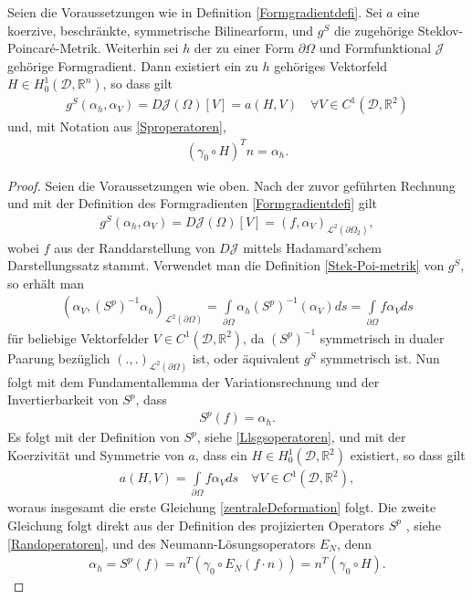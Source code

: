 \begin{theorem}
Seien die Voraussetzungen wie in Definition \ref{Formgradientdefi}. Sei $a$ eine koerzive, beschränkte, symmetrische Bilinearform, und $g^S$ die zugehörige Steklov-Poincaré-Metrik. Weiterhin sei $h$ der zu einer Form $\partial\Omega$ und Formfunktional $\mathcal{J}$ gehörige Formgradient. Dann existiert ein zu $h$ gehöriges Vektorfeld $H \in H^1_0(\mathcal{D}, \mathbb{R}^n)$, so dass gilt
\begin{equation}
\label{zentraleDeformation}
\begin{aligned}
	g^S(\alpha_h, \alpha_V) = D\mathcal{J}(\Omega)[V] = a(H,V) \quad \forall  V \in C^1(\mathcal{D},\mathbb{R}^2)
\end{aligned}
\end{equation}
und, mit Notation aus \ref{Sproperatoren},
\begin{align*}
	(\gamma_0\circ H)^T n = \alpha_h.
\end{align*}
\end{theorem}

\begin{proof}
Seien die Voraussetzungen wie oben. Nach der zuvor geführten Rechnung und mit der Definition des Formgradienten \ref{Formgradientdefi} gilt
\begin{align*}
	g^S(\alpha_h, \alpha_V) = D\mathcal{J}(\Omega)[V] = (f,\alpha_V)_{\mathcal{L}^2(\partial\Omega_2)},
\end{align*}
wobei $f$ aus der Randdarstellung von $D\mathcal{J}$ mittels Hadamard'schem Darstellungssatz stammt. Verwendet man die Definition \ref{Stek-Poi-metrik} von $g^S$, so erhält man
\begin{align*}
	(\alpha_V,(S^p)^{-1} \alpha_h)_{\mathcal{L}^2(\partial\Omega)} = \underset{\partial\Omega}{\int} \alpha_h (S^p)^{-1}(\alpha_V)ds = 				\underset{\partial\Omega}{\int} f \alpha_V ds
\end{align*}
für beliebige Vektorfelder $V\in C^1(\mathcal{D}, \mathbb{R}^2)$, da $(S^p)^{-1}$  symmetrisch in dualer Paarung bezüglich $(.,.)_{\mathcal{L}^2(\partial\Omega)}$ ist, oder äquivalent $g^S$ symmetrisch ist.  Nun folgt mit dem Fundamentallemma der Variationsrechnung und der Invertierbarkeit von $S^p$, dass
\begin{align*}
	S^p(f) = \alpha_h.
\end{align*}
Es folgt mit der Definition von $S^p$, siehe \ref{Llsgsoperatoren}, und mit der Koerzivität und Symmetrie von $a$, dass ein $H \in H^1_0(\mathcal{D},\mathbb{R}^2)$ existiert, so dass gilt
\begin{align*}
	a(H,V) = \underset{\partial\Omega}{\int} f \alpha_V ds \quad \forall V\in C^1(\mathcal{D},\mathbb{R}^2),
\end{align*}
woraus insgesamt die erste Gleichung \ref{zentraleDeformation} folgt. Die zweite Gleichung folgt direkt aus der Definition des projizierten Operators $S^p$ , siehe \ref{Randoperatoren}, und des Neumann-Lösungsoperators $E_N$, denn
\begin{align*}
	\alpha_h = S^p(f) = n^T(\gamma_0\circ E_N(f\cdot n)) = n^T(\gamma_0 \circ H).
\end{align*}
\end{proof}

